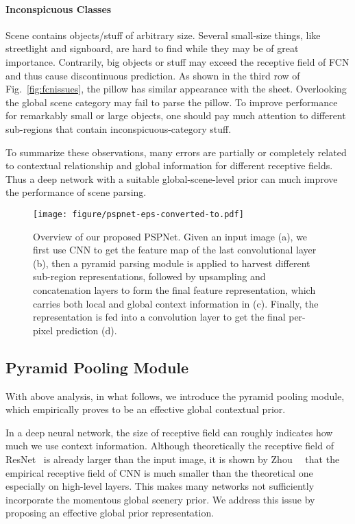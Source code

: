 \documentclass[10pt,twocolumn,letterpaper]{article}
\begin{document}
\vspace{-0.1in}
\paragraph{Inconspicuous Classes}%
Scene contains objects/stuff of arbitrary size. Several small-size things, like
streetlight and signboard, are hard to find while they may be of great importance.
Contrarily, big objects or stuff may exceed the receptive field of FCN and thus cause
discontinuous prediction. As shown in the third row of Fig.~\ref{fig:fcnissues}, the
pillow has similar appearance with the sheet. Overlooking the global scene category may
fail to parse the pillow. To improve performance for remarkably small or large objects,
one should pay much attention to different sub-regions that contain
inconspicuous-category stuff.

To summarize these observations, many errors are partially or completely related to
contextual relationship and global information for different receptive fields. Thus a
deep network with a suitable global-scene-level prior can much improve the performance of
scene parsing.

\begin{figure*}
\begin{center}
\texttt{[image: figure/pspnet-eps-converted-to.pdf]}
\end{center}
\caption{Overview of our proposed PSPNet. Given an input image (a), we first use CNN to
get the feature map of the last convolutional layer (b), then a pyramid parsing module is
applied to harvest different sub-region representations, followed by upsampling and
concatenation layers to form the final feature representation, which carries both local
and global context information in (c). Finally, the representation is fed into a
convolution layer to get the final per-pixel prediction (d).} \label{fig:pspnet}
\end{figure*}


\subsection{Pyramid Pooling Module}

With above analysis, in what follows, we introduce the pyramid pooling module, which
empirically proves to be an effective global contextual prior.

In a deep neural network, the size of receptive field can roughly indicates how much we
use context information. Although theoretically the receptive field of
ResNet~\cite{he2015deep} is already larger than the input image, it is shown by
Zhou~\etal~\cite{zhou2014object} that the empirical receptive field of CNN is much
smaller than the theoretical one especially on high-level layers. This makes many
networks not sufficiently incorporate the momentous global scenery prior. We address this
issue by proposing an effective global prior representation.
\end{document}
